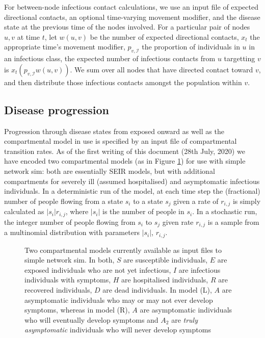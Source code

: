 \documentclass[11pt]{article}
\begin{document}
For between-node infectious contact calculations, we use an input file of expected directional contacts, an optional time-varying movement modifier, and the disease state at the previous time of the nodes involved.  For a particular pair of nodes $u, v$ at time $t$, let $w(u, v)$ be the number of expected directional contacts, $x_t$ the appropriate time's movement modifier, $p_{v,\mathcal{I}}$ the proportion of individuals in $u$ in an infectious class, the expected number of infectious contacts from $u$ targetting $v$ is $x_t(p_{v,\mathcal{I}}w(u, v))$.  We sum over all nodes that have directed contact toward $v$, and then distribute those infectious contacts amongst the population within $v$.

\subsection{Disease progression}
Progression through disease states from exposed onward as well as the compartmental model in use is specified by an input file of compartmental transition rates.   As of the first writing of this document (28th July, 2020) we have encoded two compartmental models (as in Figure \ref{fig:compartments}) for use with simple network sim: both are essentially SEIR models, but with additional compartments for severely ill (assumed hospitalised) and asymptomatic infectious individuals.  In a deterministic run of the model, at each time step the (fractional) number of people flowing from a state $s_i$ to a state $s_j$ given a rate of $r_{i,j}$ is simply calculated as $|s_i|r_{i,j}$, where $|s_i|$ is the number of people in $s_i$.  In a stochastic run, the integer number of people flowing from $s_i$ to $s_j$ given rate $r_{i,j}$ is a sample from a multinomial distribution with parameters $|s_i|$, $r_{i,j}$.

\begin{figure}[h!]
\caption{Two compartmental models currently available as input files to simple network sim.  In both, $S$ are susceptible individuals, $E$ are exposed individuals who are not yet infectious, $I$ are infectious individuals with symptoms,  $H$ are hospitalised individuals, $R$ are recovered individuals, $D$ are dead individuals. In model (L), $A$  are asymptomatic individuals who may or may not ever develop symptoms, whereas in model (R), $A$ are asymptomatic individuals who will eventually develop symptoms and \textbf{$A_2$} are \emph{truly asymptomatic} individuals who will never develop symptoms}
\label{fig:compartments}
\end{figure}
\end{document}
